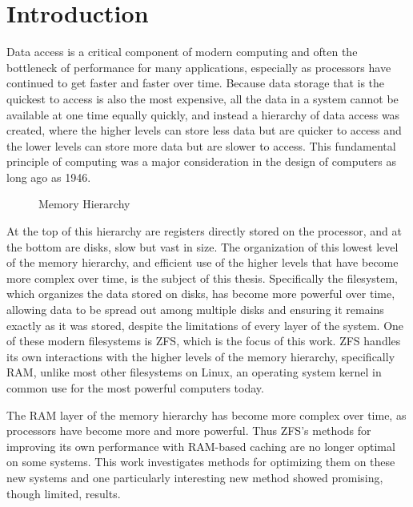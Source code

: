 \chapter{Introduction}
Data access is a critical component of modern computing and often the bottleneck of performance for many applications,
especially as processors have continued to get faster and faster over time.
Because data storage that is the quickest to access is also the most expensive, 
all the data in a system cannot be available at one time equally quickly,
and instead a hierarchy of data access was created, where the higher levels can store less data but are quicker to access and the
lower levels can store more data but are slower to access.
This fundamental principle of computing was a major consideration in the design of
computers as long ago as 1946\cite{burks_preliminary_1946}.

\begin{figure}[H]
    \centering
    \resizebox{0.5\linewidth}{!}{}
    \captionsetup{width=0.5\linewidth}
    \caption{Memory Hierarchy}
    \label{fig:memoryhierarchy}
\end{figure}

At the top of this hierarchy are registers directly stored on the processor, and at the bottom are disks,
slow but vast in size.
The organization of this lowest level of the memory hierarchy, and efficient use of the higher levels that have become more
complex over time,
is the subject of this thesis.
Specifically the filesystem, which organizes the data stored on disks, has become more powerful over time, allowing
data to be spread out among multiple disks and ensuring it remains exactly as it was stored, despite the limitations
of every layer of the system.
One of these modern filesystems is ZFS, which is the focus of this work.
ZFS handles its own interactions with the higher levels of the memory hierarchy, specifically RAM,
unlike most other filesystems on Linux, an operating system kernel in common use for the most powerful computers today.

The RAM layer of the memory hierarchy has become more complex over time, as processors have become more and more powerful.
Thus ZFS's methods for improving its own performance with RAM-based caching are no longer optimal on some systems.
This work investigates methods for optimizing them on these new systems and one particularly interesting new method showed
promising, though limited, results.


